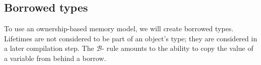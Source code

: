 \documentclass[UKenglish, 11pt, a4paper, parskip=half]{scrbook}
\begin{document}

\subsection{Borrowed types}

To use an ownership-based memory model, we will create borrowed types.
Lifetimes are not considered to be part of an object's type; they are considered in a later compilation step.
The $\mathcal B$-\relim{} rule amounts to the ability to copy the value of a variable from behind a borrow.
\end{document}
